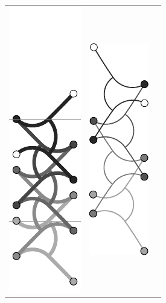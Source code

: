 \documentclass[10pt,a4paper]{article}
\begin{document}
\begin{figure}
\begin{center}
\begin{tabular}{ccc}
\includegraphics[scale=1]{../Pics/py/straight_f_ori_1.pdf}&
\includegraphics[scale=1]{../Pics/py/straight_f_ori_01.pdf}&

\end{tabular}
\end{center}
\end{figure}
\end{document}

